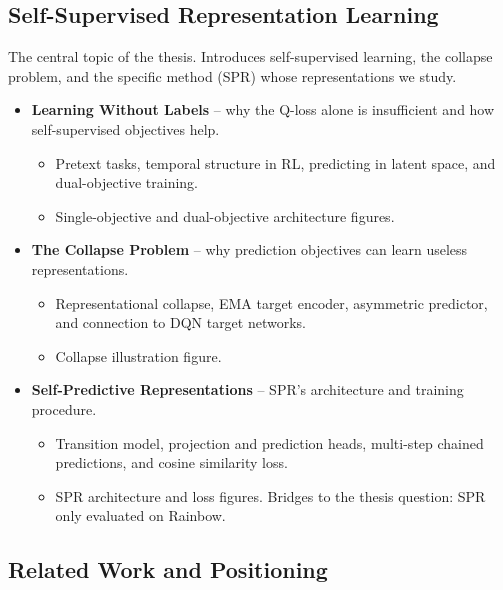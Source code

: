 \documentclass[11pt]{article}
\begin{document}
\subsection{Self-Supervised Representation Learning}

\noindent The central topic of the thesis. Introduces self-supervised
learning, the collapse problem, and the specific method (SPR) whose
representations we study.

\begin{itemize}
\item \textbf{Learning Without Labels} -- why the Q-loss alone is
  insufficient and how self-supervised objectives help.
  \begin{itemize}[label=$\circ$, itemsep=0.2em, parsep=0pt, topsep=0pt, partopsep=0pt]
  \item Pretext tasks, temporal structure in RL, predicting in
    latent space, and dual-objective training.
  \item Single-objective and dual-objective architecture figures.
  \end{itemize}
\item \textbf{The Collapse Problem} -- why prediction objectives
  can learn useless representations.
  \begin{itemize}[label=$\circ$, itemsep=0.2em, parsep=0pt, topsep=0pt, partopsep=0pt]
  \item Representational collapse, EMA target encoder, asymmetric
    predictor, and connection to DQN target networks.
  \item Collapse illustration figure.
  \end{itemize}
\item \textbf{Self-Predictive Representations} -- SPR's architecture
  and training procedure.
  \begin{itemize}[label=$\circ$, itemsep=0.2em, parsep=0pt, topsep=0pt, partopsep=0pt]
  \item Transition model, projection and prediction heads,
    multi-step chained predictions, and cosine similarity loss.
  \item SPR architecture and loss figures. Bridges to the thesis
    question: SPR only evaluated on Rainbow.
  \end{itemize}
\end{itemize}

\subsection{Related Work and Positioning}
\end{document}
